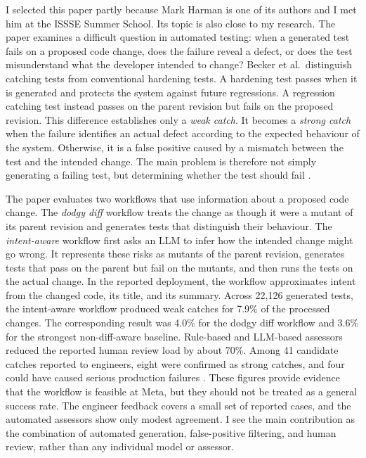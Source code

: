 I selected this paper partly because Mark Harman is one of its authors and I met him at the ISSSE Summer School. Its topic is also close to my research. The paper examines a difficult question in automated testing: when a generated test fails on a proposed code change, does the failure reveal a defect, or does the test misunderstand what the developer intended to change? Becker et al.\ distinguish catching tests from conventional hardening tests. A hardening test passes when it is generated and protects the system against future regressions. A regression catching test instead passes on the parent revision but fails on the proposed revision. This difference establishes only a \emph{weak catch}. It becomes a \emph{strong catch} when the failure identifies an actual defect according to the expected behaviour of the system. Otherwise, it is a false positive caused by a mismatch between the test and the intended change. The main problem is therefore not simply generating a failing test, but determining whether the test should fail \cite{DBLP:conf/sigsoft/BeckerCCGGHHHRL26}.

The paper evaluates two workflows that use information about a proposed code change. The \emph{dodgy diff} workflow treats the change as though it were a mutant of its parent revision and generates tests that distinguish their behaviour. The \emph{intent-aware} workflow first asks an LLM to infer how the intended change might go wrong. It represents these risks as mutants of the parent revision, generates tests that pass on the parent but fail on the mutants, and then runs the tests on the actual change. In the reported deployment, the workflow approximates intent from the changed code, its title, and its summary. Across 22,126 generated tests, the intent-aware workflow produced weak catches for 7.9\% of the processed changes. The corresponding result was 4.0\% for the dodgy diff workflow and 3.6\% for the strongest non-diff-aware baseline. Rule-based and LLM-based assessors reduced the reported human review load by about 70\%. Among 41 candidate catches reported to engineers, eight were confirmed as strong catches, and four could have caused serious production failures \cite{DBLP:conf/sigsoft/BeckerCCGGHHHRL26}. These figures provide evidence that the workflow is feasible at Meta, but they should not be treated as a general success rate. The engineer feedback covers a small set of reported cases, and the automated assessors show only modest agreement. I see the main contribution as the combination of automated generation, false-positive filtering, and human review, rather than any individual model or assessor.

